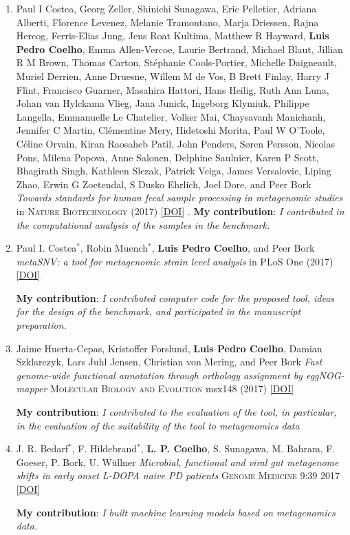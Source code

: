 \documentclass{article}
\newcommand\showdoi[1]{%
    \href{http://dx.doi.org/#1}{[DOI]}%
}
\newcommand\pubname[1]{\textsc{#1}}
\newcommand\contribution[1]{\relax\hfill\break\textbf{My contribution}: \textit{#1}}
\begin{document}
\begin{enumerate}[resume]
\item Paul I Costea, Georg Zeller, Shinichi Sunagawa, Eric Pelletier, Adriana
Alberti, Florence Levenez, Melanie Tramontano, Marja Driessen, Rajna Hercog,
Ferris-Elias Jung, Jens Roat Kultima, Matthew R Hayward, \textbf{Luis Pedro
Coelho}, Emma Allen-Vercoe, Laurie Bertrand, Michael Blaut, Jillian R M Brown,
Thomas Carton, Stéphanie Cools-Portier, Michelle Daigneault, Muriel Derrien,
Anne Druesne, Willem M de Vos, B Brett Finlay, Harry J Flint, Francisco
Guarner, Masahira Hattori, Hans Heilig, Ruth Ann Luna, Johan van Hylckama
Vlieg, Jana Junick, Ingeborg Klymiuk, Philippe Langella, Emmanuelle Le
Chatelier, Volker Mai, Chaysavanh Manichanh, Jennifer C Martin, Clémentine
Mery, Hidetoshi Morita, Paul W O'Toole, Céline Orvain, Kiran Raosaheb Patil,
John Penders, Søren Persson, Nicolas Pons, Milena Popova, Anne Salonen,
Delphine Saulnier, Karen P Scott, Bhagirath Singh, Kathleen Slezak, Patrick
Veiga, James Versalovic, Liping Zhao, Erwin G Zoetendal, S Dusko Ehrlich, Joel
Dore, and Peer Bork \emph{Towards standards for human fecal sample processing
in metagenomic studies} in \pubname{Nature Biotechnology} (2017)
\showdoi{10.1038/nbt.3960}.
\contribution{I contributed in the computational analysis of the samples in the
benchmark.}

\item Paul I. Costea${}^{*}$, Robin Muench${}^{*}$, \textbf{Luis Pedro Coelho},
and Peer Bork \emph{metaSNV: a tool for metagenomic strain level analysis} in
PLoS One (2017) \showdoi{10.1371/journal.pone.0182392}
\contribution{I contributed computer code for the proposed tool, ideas for the
design of the benchmark, and participated in the manuscript preparation.}

\item Jaime Huerta-Cepas, Kristoffer Forslund, \textbf{Luis Pedro Coelho},
Damian Szklarczyk, Lars Juhl Jensen, Christian von Mering, and Peer Bork
\emph{Fast genome-wide functional annotation through orthology assignment by
eggNOG-mapper} \pubname{Molecular Biology and Evolution} msx148 (2017)
\showdoi{10.1093/molbev/msx148}
\contribution{I contributed to the evaluation of the tool, in particular, in
the evaluation of the suitability of the tool to metagenomics data}

\item J. R. Bedarf${}^{*}$, F. Hildebrand${}^{*}$,  \textbf{L. P. Coelho}, S.
Sunagawa, M. Bahram, F. Goeser, P. Bork, U. Wüllner \emph{Microbial, functional
and viral gut metagenome shifts in early onset L-DOPA naive PD patients}
\pubname{Genome Medicine} 9:39 2017 \showdoi{10.1186/s13073-017-0428-y}
\contribution{I built machine learning models based on metagenomics data.}


\end{enumerate}
\end{document}
